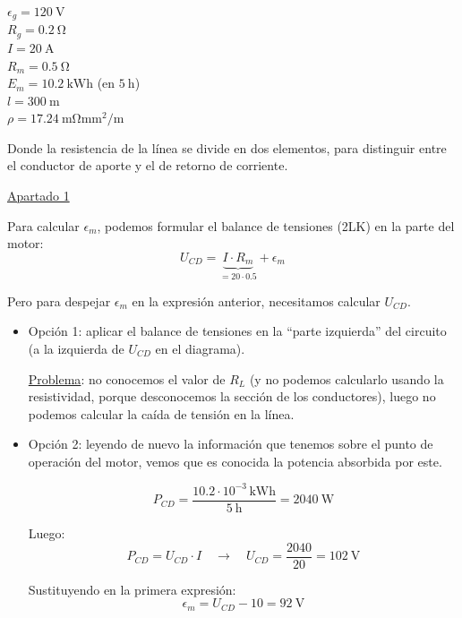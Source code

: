 \begin{example}
\begin{minipage}{0.27\linewidth}
  $\epsilon_g = \qty{120}{\volt}$\\
  $R_g = \qty{0.2}{\ohm}$\\
  $I = \qty{20}{\ampere}$\\
  $R_m = \qty{0.5}{\ohm}$\\
  $E_m = \qty{10.2}{\kWh}$ (en $\qty{5}{\hour}$)\\
  $l = \qty{300}{\meter}$\\
  $\rho = \qty{17.24}{\milli\ohm\milli\meter\squared\per\meter}$
\end{minipage}

\vspace{6mm}

Donde la resistencia de la línea se divide en dos elementos, para
distinguir entre el conductor de aporte y el de retorno de corriente.

\vspace{6mm}

\underline{Apartado 1}

\vspace{4mm}

Para calcular $\epsilon_m$, podemos formular el balance de tensiones
(2LK) en la parte del motor:
\[
  U_{CD} = \underbrace{I \cdot R_m}_{= 20 \cdot 0.5} + \epsilon_m
\]

Pero para despejar $\epsilon_m$ en la expresión anterior, necesitamos
calcular $U_{CD}$.
\begin{itemize}
\item Opción 1: aplicar el balance de tensiones en la ``parte
  izquierda'' del circuito (a la izquierda de $U_{CD}$ en el
  diagrama).
    
  \underline{Problema}: no conocemos el valor de $R_L$ (y no podemos
  calcularlo usando la resistividad, porque desconocemos la sección de
  los conductores), luego no podemos calcular la caída de tensión en
  la línea.
    
\item Opción 2: leyendo de nuevo la información que tenemos sobre el
  punto de operación del motor, vemos que es conocida la potencia
  absorbida por este.

    \[
      P_{CD} = \frac{10.2 \cdot 10^{-3} \, \si{\kWh}}{\qty{5}{\hour}}
      = \qty{2040}{\watt}
    \]

    Luego:
    \[
      P_{CD} = U_{CD} \cdot I \quad \rightarrow \quad U_{CD} =
      \frac{2040}{20} = \qty{102}{\volt}
    \]

    Sustituyendo en la primera expresión:
    \[
      \epsilon_m = U_{CD} - 10 = \boxed{ \qty{92}{\volt} }
    \]


\end{itemize}
\end{example}
